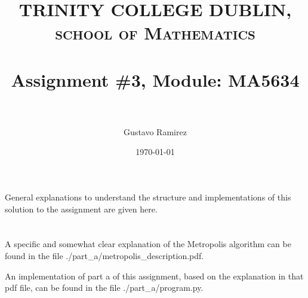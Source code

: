 \documentclass[paper=a4, fontsize=11pt]{scrartcl} %
\title{	
\normalfont \normalsize 
\textsc{TRINITY COLLEGE DUBLIN, school of Mathematics} \\ [25pt] %
\horrule{0.5pt} \\[0.4cm] %
\huge Assignment \#3, Module: MA5634 \\ %
\horrule{2pt} \\[0.5cm] %
}
\author{Gustavo Ramirez} %
\date{\normalsize\today} %
\numberwithin{equation}{section} %
\numberwithin{figure}{section} %
\numberwithin{table}{section} %
\begin{document}
\maketitle %



General explanations to understand the structure and implementations of this solution to the assignment are given here.


\newpage




\section{}

A specific and somewhat clear explanation of the Metropolis algorithm can be found in the file ./part\_a/metropolis\_description.pdf.

An implementation of part a of this assignment, based on the explanation in that pdf file, can be found in the file ./part\_a/program.py.


\section{}




\section{}




\section{}





\section{}
\end{document}

